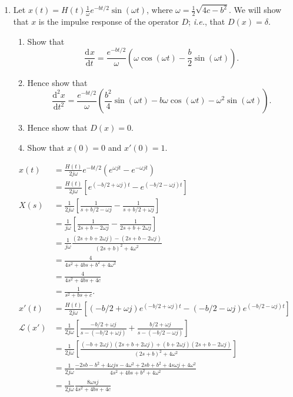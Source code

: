 \documentclass{article}
\newcommand{\deriv}[3][]{\frac{\mathrm{d}^{#1}#2}{\mathrm{d}#3^{#1}}}
\begin{document}
\begin{enumerate}
	\item Let $x(t)=H(t)\frac{1}{\omega}e^{-bt/2}\sin(\omega t)$, where $\omega = \frac{1}{2}\sqrt{4c-b^2}$. We will show that $x$ is the impulse response of the operator $D$; \textit{i.e.}, that $D(x)=\delta$.
		\begin{enumerate}
			\item Show that
				\[\deriv{x}{t}=\frac{e^{-bt/2}}{\omega}\left(\omega \cos(\omega t) - \frac{b}{2}\sin(\omega t)\right).\]
			\item Hence show that
				\[\deriv[2]{x}{t} = \frac{e^{-bt/2}}{\omega}\left(\frac{b^2}{4}\sin(\omega t) -b\omega\cos(\omega t) -\omega^2\sin(\omega t)\right).\]
			\item Hence show that $D(x)=0$.
			\item Show that $x(0)=0$ and $x'(0)=1$.
		\end{enumerate}
		\begin{align*}
			x(t)&=\frac{H(t)}{2j\omega}e^{-bt/2}(e^{\omega j t}-e^{-\omega j t})\\
			&=\frac{H(t)}{2j\omega}\left[e^{(-b/2 + \omega j)t}-e^{(-b/2-\omega j)t}\right]\\
			X(s)&=\frac{1}{2j\omega}\left[\frac{1}{s+b/2 - \omega j}-\frac{1}{s+b/2+\omega j}\right]\\
			&=\frac{1}{j\omega}\left[\frac{1}{2s+b-2\omega j}-\frac{1}{2s+b+2\omega j}\right]\\
			&=\frac{1}{j\omega}\frac{(2s+b+2\omega j)-(2s+b-2\omega j)}{(2s+b)^2+4\omega^2}\\
			&=\frac{4}{4s^2+4bs+b^2+4\omega^2}\\
			&=\frac{4}{4s^2+4bs+4c}\\
			&=\frac{1}{s^2+bs+c}.\\
			x'(t) &=\frac{H(t)}{2j\omega}\left[(-b/2 +\omega j)e^{(-b/2+\omega j)t} - (-b/2-\omega j)e^{(-b/2-\omega j)t}\right]\\
			\mathcal{L}(x')&= \frac{1}{2j\omega}\left[\frac{-b/2+\omega j}{s-(-b/2+\omega j)} + \frac{b/2+\omega j}{s-(-b/2-\omega j)}\right]\\
			&=\frac{1}{2j\omega}\left[\frac{(-b+2\omega j)(2s+b+2\omega j) + (b+2\omega j)(2s+b-2\omega j)}{(2s+b)^2 + 4\omega^2}\right]\\
			&=\frac{1}{2j\omega}\frac{-2sb-b^2+ 4\omega js -4\omega^2 + 2sb + b^2+4s\omega j +4\omega^2}{4s^2+4bs+b^2+4\omega^2}\\
			&=\frac{1}{2j\omega}\frac{8\omega s j}{4s^2+4bs+4c}\\

\end{align*}
\end{enumerate}
\end{document}
